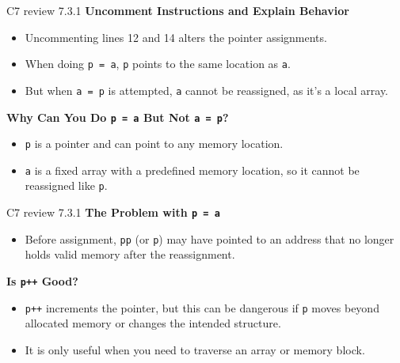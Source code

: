 \documentclass[
	11pt, %
]{beamer}
\begin{document}

\begin{frame}{C7 review 7.3.1}
    \textbf{Uncomment Instructions and Explain Behavior}
    \begin{itemize}
        \item Uncommenting lines 12 and 14 alters the pointer assignments.
        \item When doing \texttt{p = a}, \texttt{p} points to the same location as \texttt{a}.
        \item But when \texttt{a = p} is attempted, \texttt{a} cannot be reassigned, as it's a local array.
    \end{itemize}
    \textbf{Why Can You Do \texttt{p = a} But Not \texttt{a = p}?}
    \begin{itemize}
        \item \texttt{p} is a pointer and can point to any memory location.
        \item \texttt{a} is a fixed array with a predefined memory location, so it cannot be reassigned like \texttt{p}.
    \end{itemize}
\end{frame}

\begin{frame}{C7 review 7.3.1}
    \textbf{The Problem with \texttt{p = a}}
    \begin{itemize}
        \item Before assignment, \texttt{pp} (or \texttt{p}) may have pointed to an address that no longer holds valid memory after the reassignment.
    \end{itemize}
	\textbf{Is \texttt{p++} Good?}
    \begin{itemize}
        \item \texttt{p++} increments the pointer, but this can be dangerous if \texttt{p} moves beyond allocated memory or changes the intended structure.
        \item It is only useful when you need to traverse an array or memory block.
    \end{itemize}
\end{frame}

\end{document}
